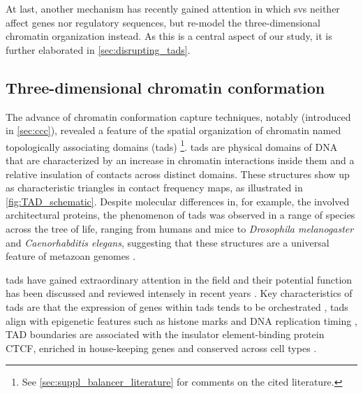At last, another mechanism has recently gained attention in which \acp{sv}
neither affect genes nor regulatory sequences, but re-model the
three-dimensional chromatin organization instead. As this is a central aspect of
our study, it is further elaborated in \cref{sec:disrupting_tads}.




\subsection{Three-dimensional chromatin conformation}
\label{sec:chromatin_conformation}


The advance of chromatin conformation capture techniques, notably \hic
(introduced in \cref{sec:ccc}), revealed a feature of the spatial organization
of chromatin named topologically associating domains (\acp{tad})
\citep{Dixon2012,Nora2012,Sexton2012,Rao2014a}\footnote{See
\cref{sec:suppl_balancer_literature} for comments on the cited literature.}.
\Acp{tad} are physical domains of
DNA that are characterized by an increase in chromatin interactions inside them
and a relative insulation of contacts across distinct domains. These structures
show up as characteristic triangles in contact frequency maps, as illustrated in
\cref{fig:TAD_schematic}. Despite molecular differences in, for example,
the involved architectural proteins, the phenomenon of \acp{tad} was observed in
a range of species across the tree of life, ranging from humans and mice to
\textit{Drosophila melanogaster} and \textit{Caenorhabditis elegans}, suggesting
that these structures are a universal feature of metazoan genomes
\citep{Dekker2015}.

\Acp{tad} have gained extraordinary attention in the field and their potential
function has been discussed and reviewed intensely in recent years
\citep[among others]{Gibcus2013,Gorkin2014,Sexton2015b,Hnisz2016a,Ruiz-Velasco2017}.
Key characteristics of \acp{tad} are that the expression of genes within
\acp{tad} tends to be orchestrated \citep[see figure 4b]{LeDily2014,Nora2012},
\acp{tad} align with epigenetic features such as histone marks \citep{Nora2012}
and DNA replication timing \citep{Pope2014,LeDily2014}, TAD boundaries are
associated with the insulator element-binding protein CTCF, enriched in
house-keeping genes and conserved across cell types
\citep{Dixon2012,Rao2014a,Schmitt2016}.

